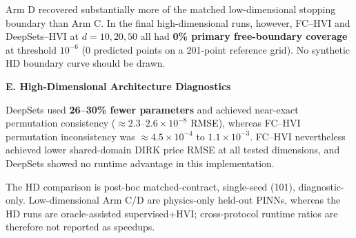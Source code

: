 \noindent
Arm D recovered substantially more of the matched low-dimensional stopping boundary than Arm C. In the final high-dimensional runs, however, FC--HVI and DeepSets--HVI at $d=10,20,50$ all had \textbf{0\% primary free-boundary coverage} at threshold $10^{-6}$ (0 predicted points on a 201-point reference grid). No synthetic HD boundary curve should be drawn.

\textbf{E. High-Dimensional Architecture Diagnostics}

\noindent
DeepSets used \textbf{26--30\% fewer parameters} and achieved near-exact permutation consistency ($\approx2.3$--$2.6\times10^{-8}$ RMSE), whereas FC--HVI permutation inconsistency was $\approx4.5\times10^{-4}$ to $1.1\times10^{-3}$. FC--HVI nevertheless achieved lower shared-domain DIRK price RMSE at all tested dimensions, and DeepSets showed no runtime advantage in this implementation.

\noindent\footnotesize
The HD comparison is post-hoc matched-contract, single-seed (101), diagnostic-only. Low-dimensional Arm C/D are physics-only held-out PINNs, whereas the HD runs are oracle-assisted supervised+HVI; cross-protocol runtime ratios are therefore not reported as speedups.
\normalsize
